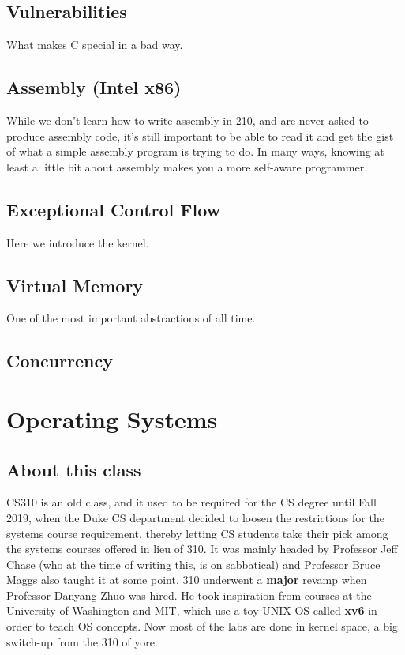 \documentclass[fontsize=12pt,twoside=on,openright,parskip=half]{scrbook}
\begin{document}
\subsection*{Vulnerabilities}
What makes C special in a bad way.

\subsection*{Assembly (Intel x86)}
While we don’t learn how to write assembly in 210, and are never asked to
produce assembly code, it’s still important to be able to read it and get the
gist of what a simple assembly program is trying to do. In many ways, knowing
at least a little bit about assembly makes you a more self-aware programmer.

\subsection*{Exceptional Control Flow}
Here we introduce the kernel.

\subsection*{Virtual Memory}
One of the most important abstractions of all time.

\subsection*{Concurrency}

\section*{Operating Systems}

\subsection*{About this class}
CS310 is an old class, and it used to be required for the CS degree until Fall
2019, when the Duke CS department decided to loosen the restrictions for the
systems course requirement, thereby letting CS students take their pick among
the systems courses offered in lieu of 310. It was mainly headed by Professor
Jeff Chase (who at the time of writing this, is on sabbatical) and Professor
Bruce Maggs also taught it at some point. 310 underwent a \textbf{major} revamp
when Professor Danyang Zhuo was hired. He took inspiration from courses at the
University of Washington and MIT, which use a toy UNIX OS called \textbf{xv6}
in order to teach OS concepts. Now most of the labs are done in kernel space, a
big switch-up from the 310 of yore.
\end{document}
